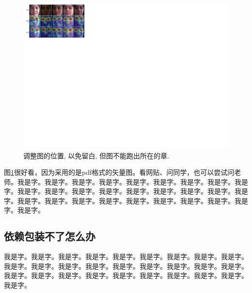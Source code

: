 \documentclass[supercite]{HustGraduPaper}
\theoremstyle{definition}
\begin{document}
\begin{figure}[htb]
	\setlength{\abovecaptionskip}{ 0.0cm}
	\setlength{\belowcaptionskip}{-0.5cm}
	\begin{center}
		\includegraphics[scale=0.65]{Fig4-1.pdf}
		\caption{调整图的位置, 以免留白, 但图不能跑出所在的章.}
		\label{fig4-1}
	\end{center}
\end{figure}

图\ref{fig4-1}很好看，因为采用的是pdf格式的矢量图。看网贴、问同学，也可以尝试问老师\cite{Euro2015WG}。我是字。我是字。我是字。我是字。我是字。我是字。我是字。我是字。我是字。我是字。我是字。我是字。我是字。我是字。我是字。我是字。我是字。我是字。我是字。我是字。我是字。我是字。我是字。我是字。我是字。我是字。我是字。我是字。


\subsection{依赖包装不了怎么办}


我是字。我是字。我是字。我是字。我是字。我是字。我是字。我是字。我是字。我是字。我是字。我是字。我是字。我是字。我是字。我是字。我是字。我是字。我是字。我是字。我是字。我是字。我是字。我是字。我是字。我是字。我是字。我是字。
\end{document}
